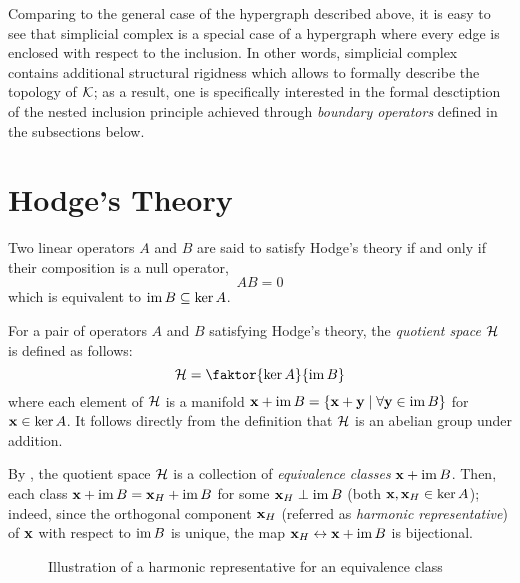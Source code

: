 Comparing to the general case of the hypergraph described above, it is easy to see that simplicial complex is a special case of a hypergraph where every edge is enclosed with respect to the inclusion. In other words, simplicial complex contains additional structural rigidness which allows to formally describe the topology of \( \mathcal{K} \); as a result, one is specifically interested in the formal desctiption of the nested inclusion principle achieved through \emph{boundary operators} defined in the subsections below.


\section{ Hodge's Theory }

Two linear operators \( A \) and \( B \) are said to satisfy Hodge's theory if and only if their composition is a null operator, 
\begin{equation}
      A B = 0
\end{equation}
which is equivalent to \( \operatorname{im} B \subseteq \ker A \).

\begin{definition}\label{def:quotient}
      For a pair of operators \( A \) and \( B \) satisfying Hodge's theory, the \emph{quotient space} \( \mathcal{H} \) is defined as follows:
      \begin{equation}
            \mc H = \faktor{ \ker A }{\im B}
      \end{equation}
      where each element of \( \mathcal{H} \) is a manifold \( \mathbf{x} + \operatorname{im} B = \left\{ \mathbf{x} + \mathbf{y} \mid \forall \mathbf{y} \in \operatorname{im} B \right\}\) for \( \mathbf{x} \in \ker A \). It follows directly from the definition that \( \mathcal{H}\) is an abelian group under addition.
\end{definition}

By , the quotient space \( \mathcal{H} \) is a collection of \emph{equivalence classes} \( \mathbf{x} + \operatorname{im} B \). Then, each class \( \mathbf{x} + \operatorname{im} B = \mathbf{x}_H + \operatorname{im} B \) for some \( \mathbf{x}_H \perp \operatorname{im} B \) (both \( \mathbf{x}, \mathbf{x}_H \in \ker A \)); indeed, since the orthogonal component \( \mathbf{x}_H \) (referred as \emph{harmonic representative}) of \( \mathbf{x} \) with respect to \( \operatorname{im} B\) is unique, the map \( \mathbf{x}_H \leftrightarrow \mathbf{x} + \operatorname{im} B \) is bijectional.

\begin{figure}[hbtp]
      \centering
            
            \caption{Illustration of a harmonic representative for an equivalence class}
\end{figure}


